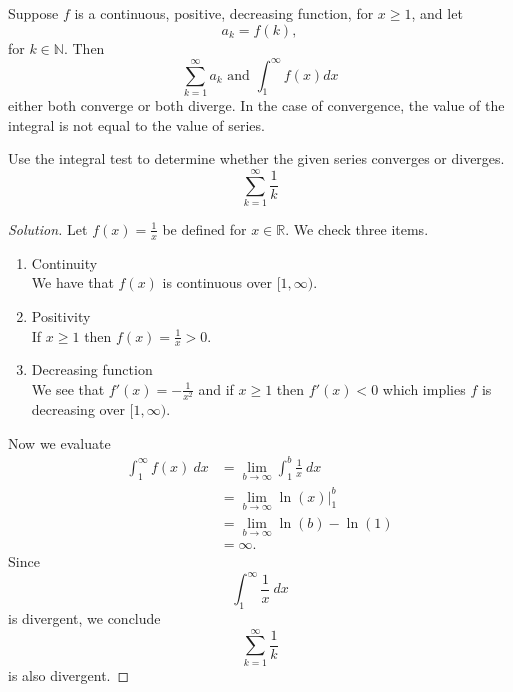 \documentclass[compacto,10pt,comentarios]{aleph-notas}
\begin{document}
\begin{teo}
    Suppose $f$ is a continuous, positive, decreasing function, for $x \geq 1$, and let
    $$
        a_k = f(k),
    $$
    for $k \in \mathbb{N}$. Then
    $$
        \sum_{k=1}^{\infty} a_k \text{ and } \int_{1}^{\infty} f(x) dx
    $$
    either both converge or both diverge. In the case of convergence, the value of the integral is not equal to the value of series.
\end{teo}

\begin{ejer}
    Use the integral test to determine whether the given series converges or diverges.
    $$
        \sum_{k=1}^{\infty} \frac{1}{k}
    $$
\end{ejer}
\begin{proof}[Solution]
    Let $f(x) = \frac{1}{x}$ be defined for $x \in \mathbb{R}$. We check three items.
    \begin{enumerate}
        \item Continuity \\
        We have that $f(x)$ is continuous over $[1, \infty)$.
        \item Positivity \\
        If $x \geq 1$ then $f(x) = \frac{1}{x} > 0$.
        \item Decreasing function \\
        We see that $f'(x) = -\frac{1}{x^2}$ and if $x \geq 1$ then $f'(x) < 0$ which implies $f$ is decreasing over $[1, \infty)$.
    \end{enumerate}
    Now we evaluate
    \begin{align*}
        \int_{1}^{\infty} f(x) ~ dx 
            & = \lim_{b \to \infty} \int_{1}^{b} \frac{1}{x} ~ dx  \\
            & = \lim_{b \to \infty} \left. \ln(x) \right\rvert_{1}^{b} \\
            & = \lim_{b \to \infty} \ln(b) - \ln(1) \\
            & = \infty.
    \end{align*}
    Since
    $$
        \int_{1}^{\infty} \frac{1}{x} ~ dx
    $$
    is divergent, we conclude
    $$
        \sum_{k=1}^{\infty} \frac{1}{k}
    $$
    is also divergent.
\end{proof}
\end{document}
